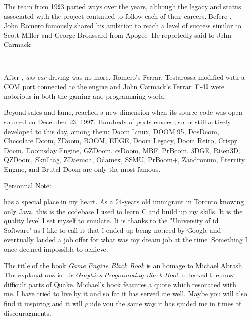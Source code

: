 The \doom{} team from 1993 parted ways over the years, although the legacy and status associated with the project continued to follow each of their careers. Before \doom{}, John Romero famously shared his ambition to reach a level of success similar to Scott Miller and George Broussard from Apogee. He reportedly said to John Carmack: \\
\par
 \\
 \par
After \doom{}, \textit{ass car} driving was no more. Romero's Ferrari Testarossa modified with a COM port connected to the engine and John Carmack's Ferrari F-40 were notorious in both the gaming and programming world.\\
\par
Beyond sales and fame, \doom{} reached a new dimension when its source code was open sourced on December 23, 1997. Hundreds of ports ensued, some still actively developed to this day, among them: Doom Linux, DOOM 95, DosDoom, Chocolate Doom, ZDoom, BOOM, EDGE, Doom Legacy, Doom Retro, Crispy Doom, Doomsday Engine, GZDoom, csDoom, MBF, PrBoom, 3DGE, Risen3D, QZDoom, Skulltag, ZDaemon, Odamex, SSMU, PrBoom+, Zandronum, Eternity Engine, and Brutal Doom are only the most famous.\\
\par
\vspace{10pt}
\b{Personnal Note:}\\
\par
\doom{} has a special place in my heart. As a 24-years old immigrant in Toronto knowing only Java, this is the codebase I used to learn C and build up my skills. It is the quality level I set myself to emulate. It is thanks to the "University of id Software" as I like to call it that I ended up being noticed by Google and eventually landed a job offer for what was my dream job at the time. Something I once deemed impossible to achieve.\\
\par
The title of the book \textit{Game Engine Black Book} is an homage to Michael Abrash. The explanations in his \textit{Graphics Programming Black Book} unlocked the most difficult parts of Quake. Michael's book features a quote which resonated with me. I have tried to live by it and so far it has served me well. Maybe you will also find it inspiring and it will guide you the same way it has guided me in times of discouragments.\\
\par
{}

